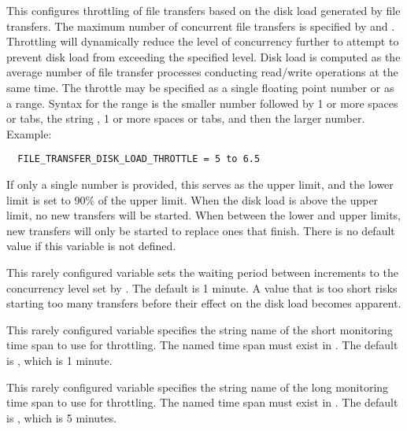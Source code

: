 \begin{description}
\label{param:FileTransferDiskLoadThrottle}
\item[\Macro{FILE\_TRANSFER\_DISK\_LOAD\_THROTTLE}]
  This configures throttling of file transfers based on the disk load
  generated by file transfers.  The maximum number of concurrent file
  transfers is specified by  and
  .  Throttling will dynamically
  reduce the level of concurrency further to attempt to prevent disk
  load from exceeding the specified level.  Disk load is computed as
  the average number of file transfer processes conducting read/write
  operations at the same time.  The throttle may be specified as a
  single floating point number or as a range.  
  Syntax for the range is the smaller number
  followed by 1 or more spaces or tabs, the string ,
  1 or more spaces or tabs, and then the larger number.
  Example: 
\begin{verbatim}
  FILE_TRANSFER_DISK_LOAD_THROTTLE = 5 to 6.5
\end{verbatim}
  If only a single number is provided, this serves as the
  upper limit, and the lower limit is set to 90\% of the upper limit.
  When the disk load is above the upper limit, no new transfers
  will be started.  When between the lower and upper limits, new
  transfers will only be started to replace ones that finish.
  There is no default value if this variable is not defined.

\label{param:FileTransferDiskLoadThrottleWaitBetweenIncrements}
\item[\Macro{FILE\_TRANSFER\_DISK\_LOAD\_THROTTLE\_WAIT\_BETWEEN\_INCREMENTS}]
  This rarely configured variable sets the waiting period between
  increments to the concurrency level set by 
  .
  The default is 1 minute.  A value that is too short risks starting
  too many transfers before their effect on the disk load becomes apparent.

\label{param:FileTransferDiskLoadThrottleShortHorizon}
\item[\Macro{FILE\_TRANSFER\_DISK\_LOAD\_THROTTLE\_SHORT\_HORIZON}]
  This rarely configured variable specifies the string name of the short
  monitoring time span to use for throttling.  The named time span must
  exist in .  The default is
  , which is 1 minute.

\label{param:FileTransferDiskLoadThrottleLongHorizon}
\item[\Macro{FILE\_TRANSFER\_DISK\_LOAD\_THROTTLE\_LONG\_HORIZON}]
  This rarely configured variable specifies the string name of the long
  monitoring time span to use for throttling.  The named time span must
  exist in .  The default is
  , which is 5 minutes.


\end{description}
